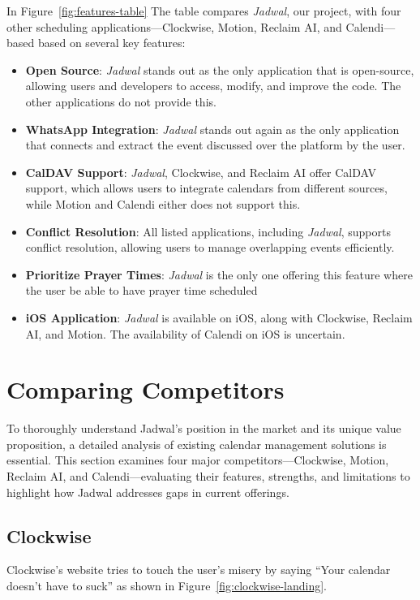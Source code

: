 \documentclass[12pt,a4paper,twoside]{report}
\begin{document}
In Figure~\ref{fig:features-table} The table compares \textit{Jadwal}, our project, with four other scheduling applications—Clockwise, Motion, Reclaim AI, and Calendi—based based on several key features:
\begin{itemize}
    \item \textbf{Open Source}: \textit{Jadwal} stands out as the only application that is open-source, allowing users and developers to access, modify, and improve the code. The other applications do not provide this.
    \item \textbf{WhatsApp Integration}: \textit{Jadwal} stands out again as the only application that connects and extract the event discussed over the platform by the user.
    \item \textbf{CalDAV Support}: \textit{Jadwal}, Clockwise, and Reclaim AI offer CalDAV support, which allows users to integrate calendars from different sources, while Motion and Calendi either does not support this.
    \item \textbf{Conflict Resolution}: All listed applications, including \textit{Jadwal}, supports conflict resolution, allowing users to manage overlapping events efficiently.
    \item \textbf{Prioritize Prayer Times}: \textit{Jadwal} is the only one offering this feature where the user be able to have prayer time scheduled
    \item \textbf{iOS Application}: \textit{Jadwal} is available on iOS, along with Clockwise, Reclaim AI, and Motion. The availability of Calendi on iOS is uncertain.
\end{itemize}

\section{Comparing Competitors}

To thoroughly understand Jadwal's position in the market and its unique value proposition, a detailed analysis of existing calendar management solutions is essential. This section examines four major competitors—Clockwise, Motion, Reclaim AI, and Calendi—evaluating their features, strengths, and limitations to highlight how Jadwal addresses gaps in current offerings.

\subsection{Clockwise}

Clockwise's website tries to touch the user's misery by saying ``Your calendar doesn't have to suck'' as shown in Figure~\ref{fig:clockwise-landing}.
\end{document}
